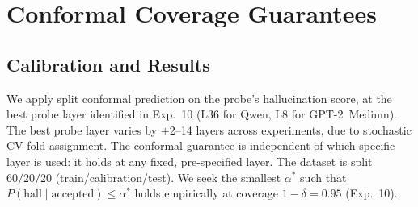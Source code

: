 \documentclass[10pt,twocolumn]{article}
\newcommand{\FloatBarrier}{\clearpage}
\begin{document}
\FloatBarrier
\section{Conformal Coverage Guarantees}
\label{sec:conformal}

\subsection{Calibration and Results}
\label{sec:conformal-results}

We apply split conformal prediction on the probe's hallucination score,
at the best probe layer identified in Exp.~10 (L36 for Qwen, L8 for
GPT-2~Medium). The best probe layer varies by $\pm$2--14 layers across
experiments, due to stochastic CV fold assignment. The conformal
guarantee is independent of which specific layer is used: it holds at
any fixed, pre-specified layer. The dataset is split $60/20/20$
(train/calibration/test). We seek the smallest $\alpha^*$ such that
$P(\text{hall} \mid \text{accepted}) \leq \alpha^*$ holds empirically at
coverage $1 - \delta = 0.95$ (Exp.~10).

\begin{table}[!htbp]
\centering
\caption{Conformal guarantee results (Exp.~10, 13, in-distribution).
  Qwen~7B from Exp.~13 (same 60/20/20 split, same calibration protocol).
  $^\S$``$\alpha = 0.10$ holds?'' asks whether the guarantee can be
  satisfied with $> 50\%$ acceptance at the nominal $0.10$ level. All
  models show \texttimes: the high ROUGE-L hallucination rate
  (${\approx}99\%$ globally) causes the hall rate to exceed $0.10$ once
  more than ${\approx}53\%$ of queries are accepted. The tighter
  $\alpha^*$ values are required to achieve formal coverage.}
\label{tab:conformal}
\small
\setlength{\tabcolsep}{4pt}
\end{table}
\end{document}
